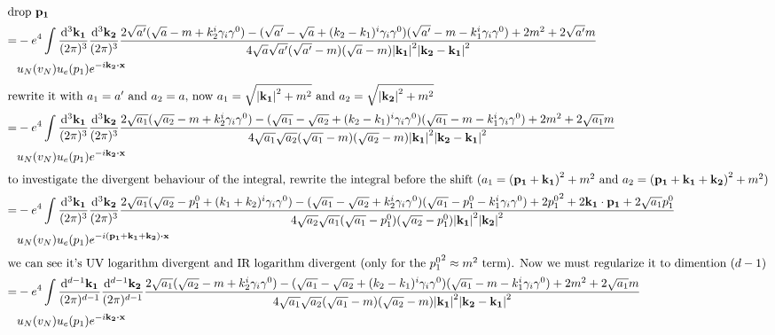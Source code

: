 \documentclass{article}
\newcommand{\g}{\gamma}
\begin{document}
\begin{align*}
  \intertext{drop $\vb{p_1}$}
  =&-e^4\int\frac{\dd^3\vb{k_1}}{(2\pi)^3}\frac{\dd^3\vb{k_2}}{(2\pi)^3}
  \frac{2\sqrt{a'}(\sqrt{a}-m+k_2^i\g_i\g^0)-(\sqrt{a'}-\sqrt{a}+(k_2-k_1)^i\g_i\g^0)(\sqrt{a'}-m-k_1^i\g_i\g^0)+2m^2+2\sqrt{a'}m}{4\sqrt{a}\sqrt{a'}(\sqrt{a'}-m)(\sqrt{a}-m){\vb{\abs{k_1}}^2\vb{\abs{k_2-k_1}}^2}}\\&
  u_N(v_N)u_e(p_1)e^{-i\vb{k_2}\vdot \vb{x}}\\
  \intertext{rewrite it with $a_1=a'$ and $a_2=a$, now $a_1=\sqrt{\abs{\vb{k_1}}^2+m^2}$ and $a_2=\sqrt{\abs{\vb{k_2}}^2+m^2}$}
   =&-e^4\int\frac{\dd^3\vb{k_1}}{(2\pi)^3}\frac{\dd^3\vb{k_2}}{(2\pi)^3}
   \frac{2\sqrt{a_1}(\sqrt{a_2}-m+k_2^i\g_i\g^0)-(\sqrt{a_1}-\sqrt{a_2}+(k_2-k_1)^i\g_i\g^0)(\sqrt{a_1}-m-k_1^i\g_i\g^0)+2m^2+2\sqrt{a_1}m}{4\sqrt{a_1}\sqrt{a_2}(\sqrt{a_1}-m)(\sqrt{a_2}-m){\vb{\abs{k_1}}^2\vb{\abs{k_2-k_1}}^2}}\\&
    u_N(v_N)u_e(p_1)e^{-i\vb{k_2}\vdot \vb{x}}\\
	\intertext{to investigate the divergent behaviour of the integral, rewrite the integral before the shift ($a_1=\pqty{\vb{p_1+k_1}}^2+m^2$ and $a_2=\pqty{\vb{p_1+k_1+k_2}}^2+m^2$)}
  =&-e^4\int\frac{\dd^3\vb{k_1}}{(2\pi)^3}\frac{\dd^3\vb{k_2}}{(2\pi)^3}
  \frac{2\sqrt{a_1}(\sqrt{a_2}-p_1^0+(k_1+k_2)^i\g_i\g^0)-(\sqrt{a_1}-\sqrt{a_2}+k_2^i\g_i\g^0)(\sqrt{a_1}-p_1^0-k_1^i\g_i\g^0)+2{p_1^0}^2+2\vb{k_1\cdot p_1}+2\sqrt{a_1}p_1^0}{4\sqrt{a_2}\sqrt{a_1}(\sqrt{a_1}-p_1^0)(\sqrt{a_2}-p_1^0){\vb{\abs{k_1}}^2\vb{\abs{k_2}}^2}}\\&
  u_N(v_N)u_e(p_1)e^{-i\vb{(p_1+k_1+k_2)}\vdot \vb{x}}\\
  \intertext{we can see it's UV logarithm divergent and IR logarithm
	divergent (only for the ${p_1^0}^2\approx m^2$ term). Now we must regularize it to dimention $(d-1)$}
  =&-e^4\int\frac{\dd^{d-1}\vb{k_1}}{(2\pi)^{d-1}}\frac{\dd^{d-1}\vb{k_2}}{(2\pi)^{d-1}}
  \frac{2\sqrt{a_1}(\sqrt{a_2}-m+k_2^i\g_i\g^0)-(\sqrt{a_1}-\sqrt{a_2}+(k_2-k_1)^i\g_i\g^0)(\sqrt{a_1}-m-k_1^i\g_i\g^0)+2m^2+2\sqrt{a_1}m}{4\sqrt{a_1}\sqrt{a_2}(\sqrt{a_1}-m)(\sqrt{a_2}-m){\vb{\abs{k_1}}^2\vb{\abs{k_2-k_1}}^2}}\\&
    u_N(v_N)u_e(p_1)e^{-i\vb{k_2}\vdot \vb{x}}\\

\end{align*}
\end{document}
